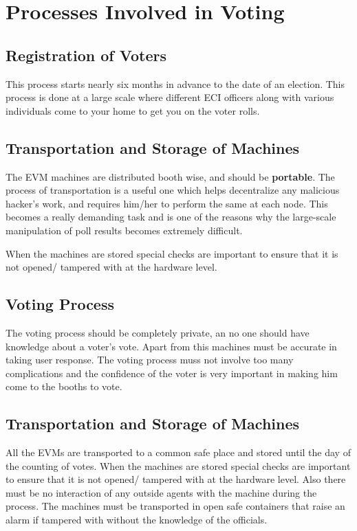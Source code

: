 \documentclass[a4paper,12pt]{extarticle}
\begin{document}
\section{Processes Involved in Voting}

\subsection{Registration of Voters}
This process starts nearly six months in advance to the date of an election. This process is done at a large scale where different ECI officers along with various individuals come to your home to get you on the voter rolls.
\subsection{Transportation and Storage of Machines}
The EVM machines are distributed booth wise, and  should be \textbf{portable}. The process of transportation is a useful one which helps decentralize any malicious hacker's work, and requires him/her to perform the same at each node. This becomes a really demanding task and is one of the reasons why the large-scale manipulation of poll results becomes extremely difficult.

When the machines are stored special checks are important to ensure that it is not opened/ tampered with at the hardware level.

\subsection{Voting Process}
The voting process should be completely private, an no one should have knowledge about a voter's vote. Apart from this machines must be accurate in taking user response. The voting process muss not involve too many complications and the confidence of the voter is very important in making him come to the booths to vote.

\subsection{Transportation and Storage of Machines}
All the EVMs are transported to a common safe place and stored until the day of the counting of votes. When the machines are stored special checks are important to ensure that it is not opened/ tampered with at the hardware level. Also there must be no interaction of any outside agents with the machine during the process. The machines must be transported in open safe containers that raise an alarm if tampered with without the knowledge of the officials.
\end{document}
